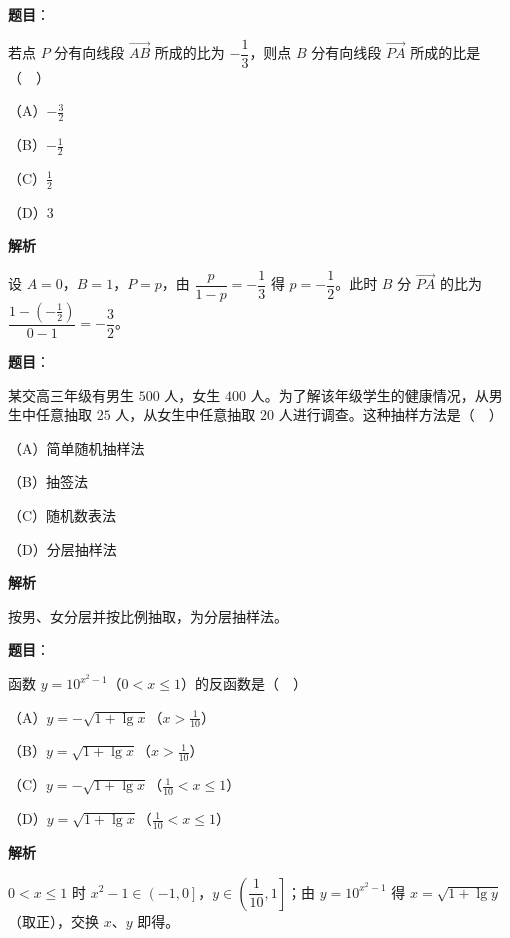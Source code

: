\begin{answer}

\textbf{题目}：

若点 $P$ 分有向线段 $\overrightarrow{AB}$ 所成的比为 $-\dfrac13$，则点 $B$ 分有向线段 $\overrightarrow{PA}$ 所成的比是（　）

（A）$-\frac32$

（B）$-\frac12$

（C）$\frac12$

（D）$3$

\textbf{解析}

设 $A=0$，$B=1$，$P=p$，由 $\dfrac{p}{1-p}=-\dfrac13$ 得 $p=-\dfrac12$。此时 $B$ 分 $\overrightarrow{PA}$ 的比为 $\dfrac{1-\left(-\frac12\right)}{0-1}=-\dfrac32$。


\end{answer}
\begin{answer}

\textbf{题目}：

某交高三年级有男生 $500$ 人，女生 $400$ 人。为了解该年级学生的健康情况，从男生中任意抽取 $25$ 人，从女生中任意抽取 $20$ 人进行调查。这种抽样方法是（　）

（A）简单随机抽样法

（B）抽签法

（C）随机数表法

（D）分层抽样法

\textbf{解析}

按男、女分层并按比例抽取，为分层抽样法。


\end{answer}
\begin{answer}

\textbf{题目}：

函数 $y=10^{x^2-1}$（$0<x\leqslant1$）的反函数是（　）

（A）$y=-\sqrt{1+\lg x}$（$x>\frac1{10}$）

（B）$y=\sqrt{1+\lg x}$（$x>\frac1{10}$）

（C）$y=-\sqrt{1+\lg x}$（$\frac1{10}<x\leqslant1$）

（D）$y=\sqrt{1+\lg x}$（$\frac1{10}<x\leqslant1$）

\textbf{解析}

$0<x\leqslant1$ 时 $x^2-1\in\left(-1,0\right]$，$y\in\left(\dfrac1{10},1\right]$；由 $y=10^{x^2-1}$ 得 $x=\sqrt{1+\lg y}$（取正），交换 $x$、$y$ 即得。


\end{answer}
